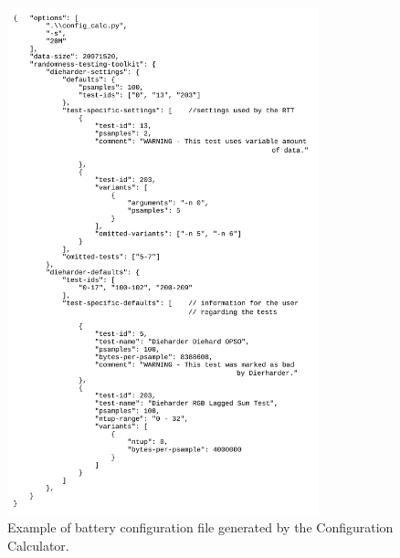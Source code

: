 \documentclass[
  digital,     %
  oneside,     %
  nosansbold,  %
  nocolorbold, %
  nolof,         %
  nolot,         %
]{fithesis4}
\begin{document}
\begin{figure}[h!]
  \begin{center}
    \includegraphics[width=9cm]{figures/config_calc/config.jpg}
  \end{center}
  \caption{Example of battery configuration file generated by the Configuration Calculator.}
  \label{fig:cc_config}
\end{figure}
\end{document}
